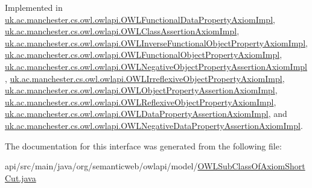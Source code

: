 Implemented in \hyperlink{classuk_1_1ac_1_1manchester_1_1cs_1_1owl_1_1owlapi_1_1_o_w_l_functional_data_property_axiom_impl_a344699251127479bfd6dac0859b3b138}{uk.\-ac.\-manchester.\-cs.\-owl.\-owlapi.\-O\-W\-L\-Functional\-Data\-Property\-Axiom\-Impl}, \hyperlink{classuk_1_1ac_1_1manchester_1_1cs_1_1owl_1_1owlapi_1_1_o_w_l_class_assertion_axiom_impl_ac69edd5b8fb3b6f9ea00a730d2f27d53}{uk.\-ac.\-manchester.\-cs.\-owl.\-owlapi.\-O\-W\-L\-Class\-Assertion\-Axiom\-Impl}, \hyperlink{classuk_1_1ac_1_1manchester_1_1cs_1_1owl_1_1owlapi_1_1_o_w_l_inverse_functional_object_property_axiom_impl_a74215ff354fb2ea2f7714b3b06a3f137}{uk.\-ac.\-manchester.\-cs.\-owl.\-owlapi.\-O\-W\-L\-Inverse\-Functional\-Object\-Property\-Axiom\-Impl}, \hyperlink{classuk_1_1ac_1_1manchester_1_1cs_1_1owl_1_1owlapi_1_1_o_w_l_functional_object_property_axiom_impl_abaca4cadf745e4f52d50369ee321b1ac}{uk.\-ac.\-manchester.\-cs.\-owl.\-owlapi.\-O\-W\-L\-Functional\-Object\-Property\-Axiom\-Impl}, \hyperlink{classuk_1_1ac_1_1manchester_1_1cs_1_1owl_1_1owlapi_1_1_o_w_l_negative_object_property_assertion_axiom_impl_a425190648b24adc25b57517f20a7d458}{uk.\-ac.\-manchester.\-cs.\-owl.\-owlapi.\-O\-W\-L\-Negative\-Object\-Property\-Assertion\-Axiom\-Impl}, \hyperlink{classuk_1_1ac_1_1manchester_1_1cs_1_1owl_1_1owlapi_1_1_o_w_l_irreflexive_object_property_axiom_impl_a716eb474686431fa0680e73dd2ad7a31}{uk.\-ac.\-manchester.\-cs.\-owl.\-owlapi.\-O\-W\-L\-Irreflexive\-Object\-Property\-Axiom\-Impl}, \hyperlink{classuk_1_1ac_1_1manchester_1_1cs_1_1owl_1_1owlapi_1_1_o_w_l_object_property_assertion_axiom_impl_a615c97d41ae72fed21ff28328bd1b032}{uk.\-ac.\-manchester.\-cs.\-owl.\-owlapi.\-O\-W\-L\-Object\-Property\-Assertion\-Axiom\-Impl}, \hyperlink{classuk_1_1ac_1_1manchester_1_1cs_1_1owl_1_1owlapi_1_1_o_w_l_reflexive_object_property_axiom_impl_a1433021906f8a4d69fc435a2a75c7c41}{uk.\-ac.\-manchester.\-cs.\-owl.\-owlapi.\-O\-W\-L\-Reflexive\-Object\-Property\-Axiom\-Impl}, \hyperlink{classuk_1_1ac_1_1manchester_1_1cs_1_1owl_1_1owlapi_1_1_o_w_l_data_property_assertion_axiom_impl_ad6f06f91826c91094c453fc25a28a39f}{uk.\-ac.\-manchester.\-cs.\-owl.\-owlapi.\-O\-W\-L\-Data\-Property\-Assertion\-Axiom\-Impl}, and \hyperlink{classuk_1_1ac_1_1manchester_1_1cs_1_1owl_1_1owlapi_1_1_o_w_l_negative_data_property_assertion_axiom_impl_ac2470f8f40455af260e752c8be74718f}{uk.\-ac.\-manchester.\-cs.\-owl.\-owlapi.\-O\-W\-L\-Negative\-Data\-Property\-Assertion\-Axiom\-Impl}.



The documentation for this interface was generated from the following file\-:\begin{DoxyCompactItemize}
\item 
api/src/main/java/org/semanticweb/owlapi/model/\hyperlink{_o_w_l_sub_class_of_axiom_short_cut_8java}{O\-W\-L\-Sub\-Class\-Of\-Axiom\-Short\-Cut.\-java}\end{DoxyCompactItemize}
